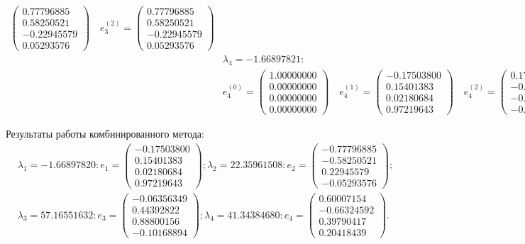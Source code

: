 \documentclass[12pt, a4paper]{article}
\begin{document}
\begin{eqnarray*}
\begin{pmatrix}
			0.77796885 \\ 0.58250521 \\-0.22945579 \\ 0.05293576
		\end{pmatrix} \quad e_3^{(2)} = \begin{pmatrix}
			0.77796885 \\ 0.58250521 \\-0.22945579 \\ 0.05293576
		\end{pmatrix} \\
		& \lambda_4 = -1.66897821:\\
		& e_4^{(0)} = \begin{pmatrix}
			1.00000000 \\ 0.00000000 \\ 0.00000000 \\ 0.00000000
		\end{pmatrix} \quad e_4^{(1)} = \begin{pmatrix}
			-0.17503800 \\ 0.15401383 \\ 0.02180684 \\ 0.97219643
		\end{pmatrix} \quad e_4^{(2)} = \begin{pmatrix}
			0.17503800 \\-0.15401383 \\-0.02180684 \\-0.97219643
		\end{pmatrix}
	\end{eqnarray*}
	
	Результаты работы комбинированного метода:
	\begin{eqnarray*}
		& \lambda_1 = -1.66897820: e_1 = \begin{pmatrix}
			-0.17503800	\\ 0.15401383	\\ 0.02180684	\\ 0.97219643
		\end{pmatrix}; \lambda_2 = 22.35961508: e_2 = \begin{pmatrix}
			-0.77796885	\\ -0.58250521	\\ 0.22945579	\\ -0.05293576
		\end{pmatrix}; \\
		& \lambda_3 = 57.16551632: e_3 = \begin{pmatrix}
			-0.06356349	\\ 0.44392822	\\ 0.88800156	\\ -0.10168894
		\end{pmatrix}; \lambda_4 = 41.34384680: e_4 = \begin{pmatrix}
			0.60007154	\\ -0.66324592	\\ 0.39790417	\\ 0.20418439
		\end{pmatrix}.
	\end{eqnarray*}
	
\end{document}
